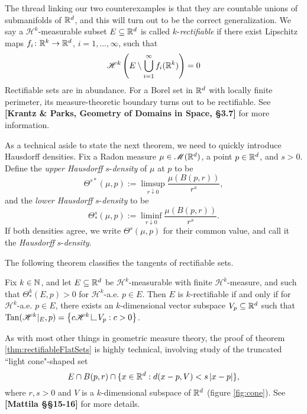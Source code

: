 The thread linking our two counterexamples is that they are countable unions of submanifolds of $\mathbb{R}^d$, and this will turn out to be the correct generalization. We say a $\mathscr{H}^k$-measurable subset $E \subseteq \mathbb{R}^d$ is called $k$-\textit{rectifiable} if there exist Lipschitz maps $f_i \colon \mathbb{R}^k \to \mathbb{R}^d$, $i = 1,\dots,\infty$, such that 
\begin{equation}
    \mathscr{H}^k\left(E \setminus \bigcup_{i=1}^\infty f_i(\mathbb{R}^k)\right) = 0
\end{equation}
Rectifiable sets are in abundance. For a Borel set in $\mathbb{R}^d$ with locally finite perimeter, its measure-theoretic boundary turns out to be rectifiable. See \textbf{[Krantz \& Parks, Geometry of Domains in Space, §3.7]} for more information.

As a technical aside to state the next theorem, we need to quickly introduce Hausdorff densities. Fix a Radon measure $\mu \in \mathscr{M}(\mathbb{R}^d)$, a point $p \in \mathbb{R}^d$, and $s > 0$. Define the \textit{upper Hausdorff} $s$-\textit{density} of $\mu$ at $p$ to be
\begin{equation}
    \Theta^{s*}(\mu,p) := \limsup_{r \downarrow 0} \frac{\mu(B(p,r))}{r^s},
\end{equation}
and the \textit{lower Hausdorff} $s$-\textit{density} to be
\begin{equation}
    \Theta^s_*(\mu,p) := \liminf_{r \downarrow 0} \frac{\mu(B(p,r))}{r^s}.
\end{equation}
If both densities agree, we write $\Theta^s(\mu,p)$ for their common value, and call it the \textit{Hausdorff} $s$-\textit{density}.

The following theorem classifies the tangents of rectifiable sets.
\begin{theorem}\label{thm:rectifiableFlatSets}
    Fix $k \in \mathbb{N}$, and let $E \subseteq \mathbb{R}^d$ be $\mathscr{H}^k$-measurable with finite $\mathscr{H}^k$-measure, and such that $\Theta_*^k(E,p) > 0$ for $\mathscr{H}^k$-a.e. $p \in E$. Then $E$ is $k$-rectifiable if and only if for $\mathscr{H}^k$-a.e. $p \in E$, there exists an $k$-dimensional vector subspace $V_p \subseteq \mathbb{R}^d$ such that $\Tan(\mathscr{H}^k \vert_E,p) = \set{ c \scrH^k \restrict V_p : c > 0 }$.
\end{theorem}
As with most other things in geometric measure theory, the proof of theorem \ref{thm:rectifiableFlatSets} is highly technical, involving study of the truncated ``light cone"-shaped set
\begin{equation}
    E \cap B(p,r) \cap \{ x \in \mathbb{R}^d : d(x-p,V) < s\left|x-p\right| \},
\end{equation}
where $r,s > 0$ and $V$ is a $k$-dimensional subspace of $\mathbb{R}^d$ (figure \ref{fig:cone}). See \textbf{[Mattila §§15-16]} for more details.

